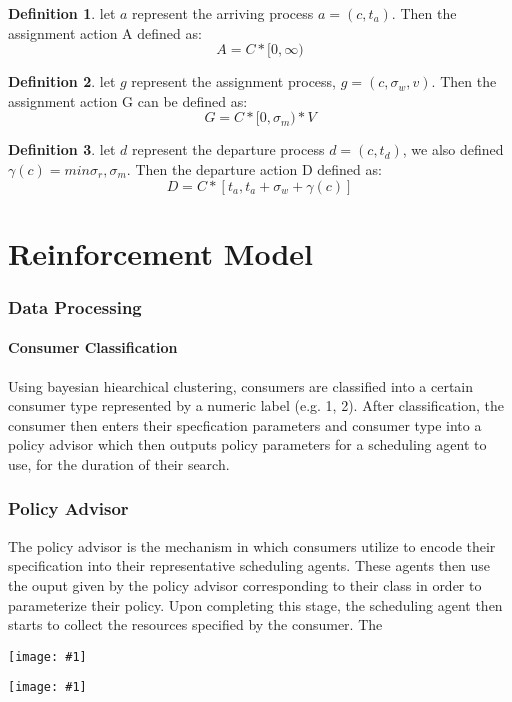 \documentclass{article}
\theoremstyle{definition}
\newtheorem{definition}{Definition}[section]
\theoremstyle{remark}
\newcommand{\addpic}[1]{\texttt{[image: \#1]}}
\begin{document}
		\begin{definition}
			let $a$ represent the arriving process $a = (c, t_a)$. Then the assignment action A defined as:
			\[
			A = C * [0, \infty)
			\]
		\end{definition}
		
		\begin{definition}
			let $g$ represent the assignment process, $g = (c,\sigma_w, v)$. Then the assignment action G can be defined as:
			\[
			G = C*[0,\sigma_m)*V
			\]
		\end{definition}
		
		\begin{definition}
			let $d$ represent the departure process $d = (c, t_d)$, we also defined $\gamma(c) = min{\sigma_r,\sigma_m}.$ Then the departure action D defined as:
			\[
			D = C * [t_a, t_a + \sigma_w + \gamma(c)]
			\]
		\end{definition}
	
	\newpage
	
	\part{Reinforcement Model}
	
	\section{Data Processing}
	
	\subsection{Consumer Classification}
	Using bayesian hiearchical clustering, consumers are classified into a certain consumer type represented by a numeric label (e.g. 1, 2). After classification, the consumer then enters their specfication parameters and consumer type into a policy advisor which then outputs policy parameters for a scheduling agent to use, for the duration of their search.
	
	\section{Policy Advisor}
	The policy advisor is the mechanism in which consumers utilize to encode their specification into their representative scheduling 	  agents. These agents then use the ouput given by the policy advisor corresponding to their class in order to parameterize their           policy. Upon completing this stage, the scheduling agent then starts to collect the resources specified by the consumer. The 
	
	\addpic{Neural-Network.jpeg}
	
	\addpic{Policy.png}
	\newpage    
	
\end{document}
